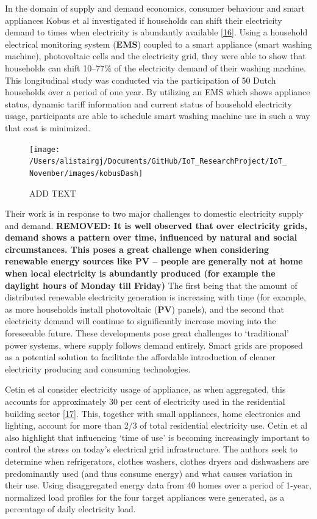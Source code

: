\documentclass[11pt,]{article}
\begin{document}
In the domain of supply and demand economics, consumer behaviour and
smart appliances Kobus et al investigated if households can shift their
electricity demand to times when electricity is abundantly available
{[}\protect\hyperlink{ref-charlotteb.a.kobusReallifeAssessmentEffect2015}{16}{]}.
Using a household electrical monitoring system (\textbf{EMS}) coupled to
a smart appliance (smart washing machine), photovoltaic cells and the
electricity grid, they were able to show that households can shift
10--77\% of the electricity demand of their washing machine. This
longitudinal study was conducted via the participation of 50 Dutch
households over a period of one year. By utilizing an EMS which shows
appliance status, dynamic tariff information and current status of
household electricity usage, participants are able to schedule smart
washing machine use in such a way that cost is minimized.

\begin{figure}[H]

{\centering \texttt{[image: /Users/alistairgj/Documents/GitHub/IoT\_ResearchProject/IoT\_November/images/kobusDash]} 

}

\caption{ADD TEXT}\label{fig:unnamed-chunk-3}
\end{figure}

Their work is in response to two major challenges to domestic
electricity supply and demand. \textbf{REMOVED: It is well observed that
over electricity grids, demand shows a pattern over time, influenced by
natural and social circumstances. This poses a great challenge when
considering renewable energy sources like PV -- people are generally not
at home when local electricity is abundantly produced (for example the
daylight hours of Monday till Friday)} The first being that the amount
of distributed renewable electricity generation is increasing with time
(for example, as more households install photovoltaic (\textbf{PV})
panels), and the second that electricity demand will continue to
significantly increase moving into the foreseeable future. These
developments pose great challenges to `traditional' power systems, where
supply follows demand entirely. Smart grids are proposed as a potential
solution to facilitate the affordable introduction of cleaner
electricity producing and consuming technologies.

Cetin et al consider electricity usage of appliance, as when aggregated,
this accounts for approximately 30 per cent of electricity used in the
residential building sector
{[}\protect\hyperlink{ref-k.s.cetinApplianceDailyEnergy2014}{17}{]}.
This, together with small appliances, home electronics and lighting,
account for more than 2/3 of total residential electricity use. Cetin et
al also highlight that influencing `time of use' is becoming
increasingly important to control the stress on today's electrical grid
infrastructure. The authors seek to determine when refrigerators,
clothes washers, clothes dryers and dishwashers are predominantly used
(and thus consume energy) and what causes variation in their use. Using
disaggregated energy data from 40 homes over a period of 1-year,
normalized load profiles for the four target appliances were generated,
as a percentage of daily electricity load.
\end{document}
